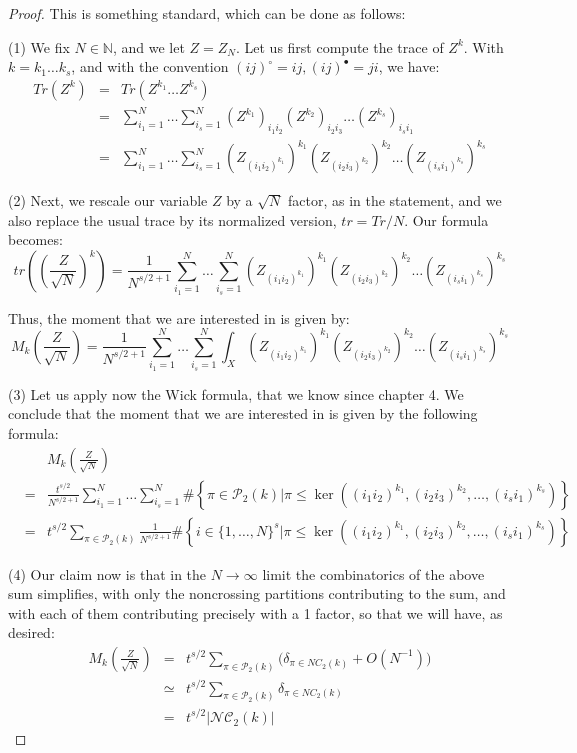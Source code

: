 \documentclass[12pt]{amsbook}
\begin{document}
\begin{proof}
This is something standard, which can be done as follows:

\medskip

(1) We fix $N\in\mathbb N$, and we let $Z=Z_N$. Let us first compute the trace of $Z^k$. With $k=k_1\ldots k_s$, and with the convention $(ij)^\circ=ij,(ij)^\bullet=ji$, we have:
\begin{eqnarray*}
Tr(Z^k)
&=&Tr(Z^{k_1}\ldots Z^{k_s})\\
&=&\sum_{i_1=1}^N\ldots\sum_{i_s=1}^N(Z^{k_1})_{i_1i_2}(Z^{k_2})_{i_2i_3}\ldots(Z^{k_s})_{i_si_1}\\
&=&\sum_{i_1=1}^N\ldots\sum_{i_s=1}^N(Z_{(i_1i_2)^{k_1}})^{k_1}(Z_{(i_2i_3)^{k_2}})^{k_2}\ldots(Z_{(i_si_1)^{k_s}})^{k_s}
\end{eqnarray*}

(2) Next, we rescale our variable $Z$ by a $\sqrt{N}$ factor, as in the statement, and we also replace the usual trace by its normalized version, $tr=Tr/N$. Our formula becomes:
$$tr\left(\left(\frac{Z}{\sqrt{N}}\right)^k\right)=\frac{1}{N^{s/2+1}}\sum_{i_1=1}^N\ldots\sum_{i_s=1}^N(Z_{(i_1i_2)^{k_1}})^{k_1}(Z_{(i_2i_3)^{k_2}})^{k_2}\ldots(Z_{(i_si_1)^{k_s}})^{k_s}$$

Thus, the moment that we are interested in is given by:
$$M_k\left(\frac{Z}{\sqrt{N}}\right)=\frac{1}{N^{s/2+1}}\sum_{i_1=1}^N\ldots\sum_{i_s=1}^N\int_X(Z_{(i_1i_2)^{k_1}})^{k_1}(Z_{(i_2i_3)^{k_2}})^{k_2}\ldots(Z_{(i_si_1)^{k_s}})^{k_s}$$

(3) Let us apply now the Wick formula, that we know since chapter 4. We conclude that the moment that we are interested in is given by the following formula:
\begin{eqnarray*}
&&M_k\left(\frac{Z}{\sqrt{N}}\right)\\
&=&\frac{t^{s/2}}{N^{s/2+1}}\sum_{i_1=1}^N\ldots\sum_{i_s=1}^N\#\left\{\pi\in\mathcal P_2(k)\Big|\pi\leq\ker\left((i_1i_2)^{k_1},(i_2i_3)^{k_2},\ldots,(i_si_1)^{k_s}\right)\right\}\\
&=&t^{s/2}\sum_{\pi\in\mathcal P_2(k)}\frac{1}{N^{s/2+1}}\#\left\{i\in\{1,\ldots,N\}^s\Big|\pi\leq\ker\left((i_1i_2)^{k_1},(i_2i_3)^{k_2},\ldots,(i_si_1)^{k_s}\right)\right\}
\end{eqnarray*}

(4) Our claim now is that in the $N\to\infty$ limit the combinatorics of the above sum simplifies, with only the noncrossing partitions contributing to the sum, and with each of them contributing precisely with a 1 factor, so that we will have, as desired:
\begin{eqnarray*}
M_k\left(\frac{Z}{\sqrt{N}}\right)
&=&t^{s/2}\sum_{\pi\in\mathcal P_2(k)}\Big(\delta_{\pi\in NC_2(k)}+O(N^{-1})\Big)\\
&\simeq&t^{s/2}\sum_{\pi\in\mathcal P_2(k)}\delta_{\pi\in NC_2(k)}\\
&=&t^{s/2}|\mathcal{NC}_2(k)|
\end{eqnarray*}


\end{proof}
\end{document}
